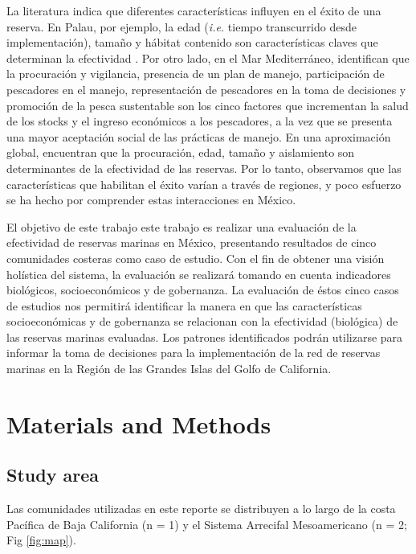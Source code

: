 \documentclass{frontiersSCNS}
\begin{document}
La literatura indica que diferentes características influyen en el éxito
de una reserva. En Palau, por ejemplo, la edad (\emph{i.e.} tiempo
transcurrido desde implementación), tamaño y hábitat contenido son
características claves que determinan la efectividad
\citep{friedlander_2017-oI}. Por otro lado, en el Mar Mediterráneo,
\citet{difranco_2016-Xw} identifican que la procuración y vigilancia,
presencia de un plan de manejo, participación de pescadores en el
manejo, representación de pescadores en la toma de decisiones y
promoción de la pesca sustentable son los cinco factores que incrementan
la salud de los stocks y el ingreso económicos a los pescadores, a la
vez que se presenta una mayor aceptación social de las prácticas de
manejo. En una aproximación global, \citet{edgar_2014-UO} encuentran que
la procuración, edad, tamaño y aislamiento son determinantes de la
efectividad de las reservas. Por lo tanto, observamos que las
características que habilitan el éxito varían a través de regiones, y
poco esfuerzo se ha hecho por comprender estas interacciones en México.

El objetivo de este trabajo este trabajo es realizar una evaluación de
la efectividad de reservas marinas en México, presentando resultados de
cinco comunidades costeras como caso de estudio. Con el fin de obtener
una visión holística del sistema, la evaluación se realizará tomando en
cuenta indicadores biológicos, socioeconómicos y de gobernanza. La
evaluación de éstos cinco casos de estudios nos permitirá identificar la
manera en que las características socioeconómicas y de gobernanza se
relacionan con la efectividad (biológica) de las reservas marinas
evaluadas. Los patrones identificados podrán utilizarse para informar la
toma de decisiones para la implementación de la red de reservas marinas
en la Región de las Grandes Islas del Golfo de California.

\section{Materials and Methods}\label{materials-and-methods}

\subsection{Study area}\label{study-area}

Las comunidades utilizadas en este reporte se distribuyen a lo largo de
la costa Pacífica de Baja California (n = 1) y el Sistema Arrecifal
Mesoamericano (n = 2; Fig \ref{fig:map}).
\end{document}
